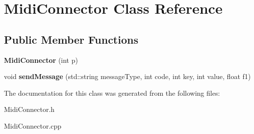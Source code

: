 \hypertarget{classMidiConnector}{}\section{Midi\+Connector Class Reference}
\label{classMidiConnector}
\subsection*{Public Member Functions}
\begin{DoxyCompactItemize}
\item 
{\bfseries Midi\+Connector} (int p)\hypertarget{classMidiConnector_a1629e8c842409a21dbc78258794556cc}{}\label{classMidiConnector_a1629e8c842409a21dbc78258794556cc}

\item 
void {\bfseries send\+Message} (std\+::string message\+Type, int code, int key, int value, float f1)\hypertarget{classMidiConnector_a700ee4383b29cd2bdc73f7cfc61a360e}{}\label{classMidiConnector_a700ee4383b29cd2bdc73f7cfc61a360e}

\end{DoxyCompactItemize}


The documentation for this class was generated from the following files\+:\begin{DoxyCompactItemize}
\item 
Midi\+Connector.\+h\item 
Midi\+Connector.\+cpp\end{DoxyCompactItemize}
